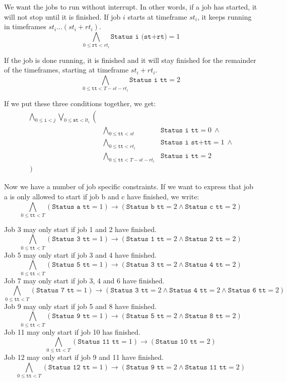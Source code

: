 \documentclass[12pt]{article}
\begin{document}
We want the jobs to run without interrupt.
In other words, if a job has started, it will not stop until it is finished. 
If job $i$ starts at timeframe $st_i$, it keeps running in timeframes $st_i \dots (st_i + rt_i)$.
\[ \bigwedge_{0 \le \texttt{rt} < rt_i} \texttt{Status i (st+rt)} = 1 \]

If the job is done running, it is finished and it will stay finished for the remainder of the timeframes, starting at timeframe $st_i + rt_i$.
\[ \bigwedge_{0 \le \texttt{tt} < T-st-rt_i} \texttt{Status i tt} = 2 \]

If we put these three conditions together, we get:
\[ \begin{array}{rll}
    \bigwedge_{0 \le \texttt{i} < j} \bigvee_{0 \le \texttt{st} < lt_i} \left( \right.&& \\
    & \bigwedge_{0 \le \texttt{tt} < st} & \texttt{Status i tt} = 0 ~ \wedge \\
    & \bigwedge_{0 \le \texttt{tt} < rt_i} & \texttt{Status i st+tt} = 1 ~ \wedge \\
    & \bigwedge_{0 \le \texttt{tt} < T-st-rt_i} & \texttt{Status i tt} = 2 \\
\left. \right)
\end{array} \]

Now we have a number of job specific constraints. 
If we want to express that job a is only allowed to start if job b and c have finished, we write: 
\[ \bigwedge_{0 \le \texttt{tt} < T} (\texttt{Status a tt} = 1) \rightarrow (\texttt{Status b tt} = 2 \wedge \texttt{Status c tt} = 2) \]

Job 3 may only start if job 1 and 2 have finished.
\[ \bigwedge_{0 \le \texttt{tt} < T} (\texttt{Status 3 tt} = 1) \rightarrow (\texttt{Status 1 tt} = 2 \wedge \texttt{Status 2 tt} = 2) \]
Job 5 may only start if job 3 and 4 have finished.
\[ \bigwedge_{0 \le \texttt{tt} < T} (\texttt{Status 5 tt} = 1) \rightarrow (\texttt{Status 3 tt} = 2 \wedge \texttt{Status 4 tt} = 2) \]
Job 7 may only start if job 3, 4 and 6 have finished.
\[ \bigwedge_{0 \le \texttt{tt} < T} (\texttt{Status 7 tt} = 1) \rightarrow (\texttt{Status 3 tt} = 2 \wedge \texttt{Status 4 tt} = 2 \wedge \texttt{Status 6 tt} = 2) \]
Job 9 may only start if job 5 and 8 have finished.
\[ \bigwedge_{0 \le \texttt{tt} < T} (\texttt{Status 9 tt} = 1) \rightarrow (\texttt{Status 5 tt} = 2 \wedge \texttt{Status 8 tt} = 2) \]
Job 11 may only start if job 10 has finished.
\[ \bigwedge_{0 \le \texttt{tt} < T} (\texttt{Status 11 tt} = 1) \rightarrow (\texttt{Status 10 tt} = 2) \]
Job 12 may only start if job 9 and 11 have finished.
\[ \bigwedge_{0 \le \texttt{tt} < T} (\texttt{Status 12 tt} = 1) \rightarrow (\texttt{Status 9 tt} = 2 \wedge \texttt{Status 11 tt} = 2) \]
\end{document}

